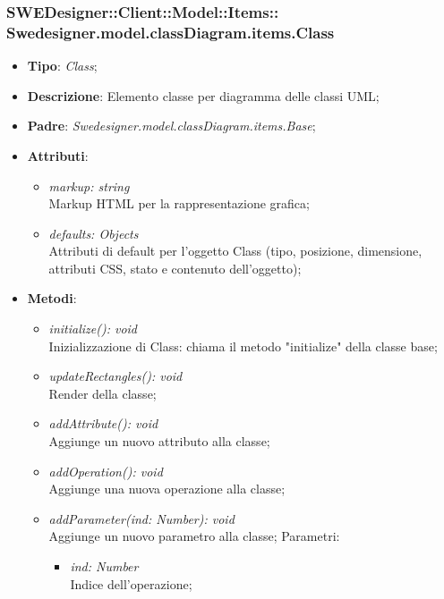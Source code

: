 \documentclass[../DefinizioneDiProdotto.tex]{subfiles}
\begin{document}
			\subsubsection[Swedesigner.model.classDiagram.items.Class]{SWEDesigner::Client::Model::Items::\\Swedesigner.model.classDiagram.items.Class}
			\hypertarget{SWEDesigner::Client::Model::Items::Swedesigner.model.classDiagram.items.Class}{}
			\begin{itemize}
				\item \textbf{Tipo}: \emph{Class};
				\item \textbf{Descrizione}: Elemento classe per diagramma delle classi UML;
				\item \textbf{Padre}: \emph{Swedesigner.model.classDiagram.items.Base};
				\item \textbf{Attributi}:
				\begin{itemize}
					\item \emph{markup: string}\\
					Markup HTML per la rappresentazione grafica;
					\item \emph{defaults: Objects}\\
					Attributi di default per l'oggetto Class (tipo, posizione, dimensione, attributi CSS, stato e contenuto dell'oggetto);
				\end{itemize}
				\item \textbf{Metodi}:
				\begin{itemize}
					\item \emph{initialize(): void}\\
					Inizializzazione di Class: chiama il metodo "initialize" della classe base;
					\item \emph{updateRectangles(): void}\\
					Render della classe;
					\item \emph{addAttribute(): void}\\
					Aggiunge un nuovo attributo alla classe;
					\item \emph{addOperation(): void}\\
					Aggiunge una nuova operazione alla classe;	
					\item \emph{addParameter(ind: Number): void}\\
					Aggiunge un nuovo parametro alla classe;
					Parametri:
					\begin{itemize}
						\item \emph{ind: Number} \\
						Indice dell'operazione;

\end{itemize}
\end{itemize}
\end{itemize}
\end{document}
